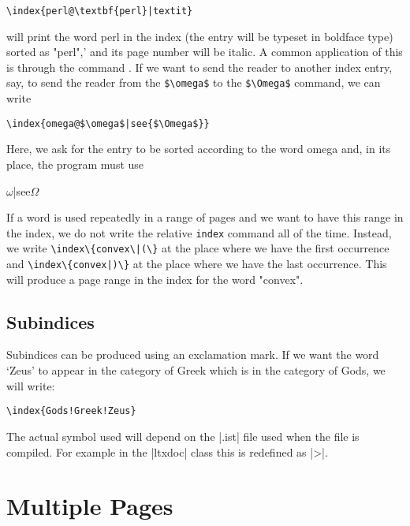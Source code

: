 \begin{multicols}{2}
\verb+\index{perl@\textbf{perl}|textit}+


will print the word perl in the index (the entry will be typeset in boldface type) sorted
as "perl",’ and its page number will be italic. A common application of this is through
the command . If we want to send the reader to another index entry, say, to send
the reader from the \verb+$\omega$+ to the \verb+$\Omega$+ command, we can write

\verb+\index{omega@$\omega$|see{$\Omega$}}+


Here, we ask for the entry to be sorted according to the word omega and, in its place,
the program must use 

\begin{teX}
$\omega$|see{$\Omega$}
\end{teX}

If a word is used repeatedly in a range of pages and we want to have this range
in the index, we do not write the relative \texttt{index} command all of the time. Instead,
we write \verb+\index\{convex\|(\}+  at the place where we have the first occurrence and
\verb+\index\{convex|)\}+  at the place where we have the last occurrence. This will produce a
page range in the index for the word "convex".

\subsection{Subindices}
Subindices can be produced using an exclamation mark. If we want the word `Zeus'
to appear in the category of Greek which is in the category of Gods, we will write:

\verb+\index{Gods!Greek!Zeus}+

The actual symbol used will depend on the |.ist| file used when the file is compiled. For example in the |ltxdoc| class this is redefined as |>|.
\DeclareRobustCommand\textat{%
  \bgroup\makeatother \egroup
}


\robustify{\ttdefault}
\robustify{\ttfamily}
\robustify{\color}

 \makeatletter
\def\IDX#1#2{%
   \def\xx{\expandafter\@gobble\string#2}
   \index{\bgroup\small\texttt{\textbackslash #1}>\small\texttt{\textbackslash \xx}\egroup}
}
 
 \makeatother

\IDX{chapter}{\@introduction}
\IDX{chapter}{\intro@duction}
\IDX{abr}{\@some@other}

\section{Multiple Pages}


\end{multicols}
